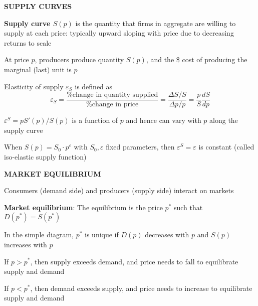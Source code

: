 \documentclass[landscape]{slides}
\begin{document}
\begin{slide}
\begin{center}
{\bf SUPPLY CURVES}
\end{center}






\textbf{Supply curve $S(p)$} is the quantity that firms in aggregate are willing to supply at each price:
 typically upward sloping with price due to decreasing returns to scale

At price $p$, producers produce quantity $S(p)$, and the \$ cost of producing the marginal (last) unit is $p$

Elasticity of supply $\varepsilon_S$ is defined as
\[ \varepsilon_S=\frac{\mbox{\% change in quantity supplied}}{\mbox{\% change in price}}=\frac{\Delta S/S}{\Delta p/p}= \frac{p}{S} \frac{dS}{dp} \]

$\varepsilon^S=p S'(p)/S(p)$ is a function of $p$ and hence can vary with $p$ along the supply
curve


When $S(p)=S_0 \cdot p^{\varepsilon}$ with $S_0, \varepsilon$ fixed parameters,
then $\varepsilon^S = \varepsilon$ is constant (called iso-elastic supply function)

\end{slide}

\begin{slide}

\end{slide}

\begin{slide}
\begin{center}
{\bf MARKET EQUILIBRIUM}
\end{center}

Consumers (demand side) and producers (supply side) interact on markets

{\bf Market equilibrium}: The equilibrium is the price $p^*$ such that $D(p^*)=S(p^*)$

In the simple diagram, $p^*$ is unique if $D(p)$ decreases with $p$ and $S(p)$ increases with $p$

If $p>p^*$, then supply exceeds demand, and price needs to fall to equilibrate supply and demand

If $p<p^*$, then demand exceeds supply, and price needs to increase to equilibrate supply and demand


\end{slide}
\end{document}

